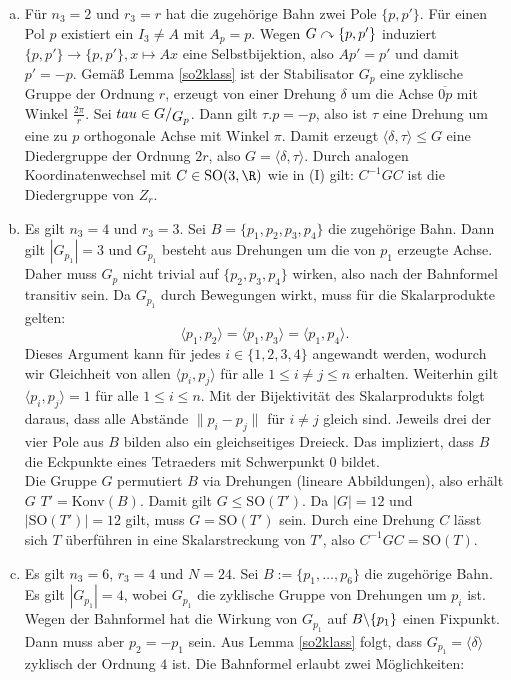 \begin{beweis}
\begin{enumerate}
\begin{enumerate}[(I)]
\begin{enumerate}[(a)]
\item Für $n_3=2$ und $r_3=r$ hat die zugehörige Bahn zwei Pole $\{p,p'\}$. Für einen Pol $p$ existiert ein $I_3 \neq A$ mit $A_p = p$. Wegen $G \curvearrowright \{p,p'\}$ induziert $\{p,p'\} \to \{p,p'\}, x \mapsto Ax$ eine Selbstbijektion, also $Ap'=p'$ und damit $p'=-p$. Gemäß Lemma \ref{so2klass} ist der Stabilisator $G_p$ eine zyklische Gruppe der Ordnung $r$, erzeugt von einer Drehung $\delta$ um die Achse $\overline{0p}$ mit Winkel $\frac{2\pi}{r}$. Sei $tau \in \quotient{G}{G_p}$. Dann gilt $\tau.p = -p$, also ist $\tau$ eine Drehung um eine zu $p$ orthogonale Achse mit Winkel $\pi$. Damit erzeugt $\langle \delta, \tau \rangle \leq G$ eine Diedergruppe der Ordnung $2r$, also $G = \langle \delta, \tau \rangle$. Durch analogen Koordinatenwechsel mit $C \in \text{SO}(3,\R)$ wie in (I) gilt: $C^{-1}GC$ ist die Diedergruppe von $Z_r$.
\item Es gilt $n_3=4$ und $r_3=3$. Sei $B=\{p_1,p_2,p_3,p_4\}$ die zugehörige Bahn. Dann gilt $|G_{p_1}| = 3$ und $G_{p_1}$ besteht aus Drehungen um die von $p_1$ erzeugte Achse. Daher muss $G_p$ nicht trivial auf $\{p_2,p_3,p_4\}$ wirken, also nach der Bahnformel transitiv sein. Da $G_{p_1}$ durch Bewegungen wirkt, muss für die Skalarprodukte gelten:
\begin{equation}
\langle p_1,p_2 \rangle = \langle p_1, p_3 \rangle = \langle p_1, p_4 \rangle.
\end{equation}
Dieses Argument kann für jedes $i \in  \{1,2,3,4\}$ angewandt werden, wodurch wir Gleichheit von allen $\langle p_i, p_j \rangle$ für alle $1 \leq i \neq j \leq n$ erhalten. Weiterhin gilt $\langle p_i , p_j \rangle =1$ für alle $1 \leq i \leq n$. Mit der Bijektivität des Skalarprodukts folgt daraus, dass alle Abstände $\|p_i-p_j\|$ für $i \neq j$ gleich sind. Jeweils drei der vier Pole aus $B$ bilden also ein gleichseitiges Dreieck. Das impliziert, dass $B$ die Eckpunkte eines Tetraeders mit Schwerpunkt $0$ bildet.\\
Die Gruppe $G$ permutiert $B$ via Drehungen (lineare Abbildungen), also erhält $G$ $T'= \text{Konv}(B)$. Damit gilt $G \leq \text{SO}(T')$. Da $|G|=12$ und $|\text{SO}(T')|=12$ gilt, muss $G=\text{SO}(T')$ sein. Durch eine Drehung $C$ lässt sich $T$ überführen in eine Skalarstreckung von $T'$, also $C^{-1}GC=\text{SO}(T)$.
\item Es gilt $n_3 = 6$, $r_3 = 4$ und $N=24$. Sei $B:= \{p_1, \dots, p_6\}$ die zugehörige Bahn. Es gilt $|G_{p_1}|=4$, wobei $G_{p_1}$ die zyklische Gruppe von Drehungen um $p_i$ ist. Wegen der Bahnformel hat die Wirkung von $G_{p_1}$ auf $B\backslash \{p_1\}$ einen Fixpunkt. Dann muss aber $p_2 = -p_1$ sein. Aus Lemma \ref{so2klass} folgt, dass $G_{p_1} =\langle \delta \rangle$ zyklisch der Ordnung $4$ ist. Die Bahnformel erlaubt zwei Möglichkeiten:

\end{enumerate}
\end{enumerate}
\end{enumerate}
\end{beweis}
